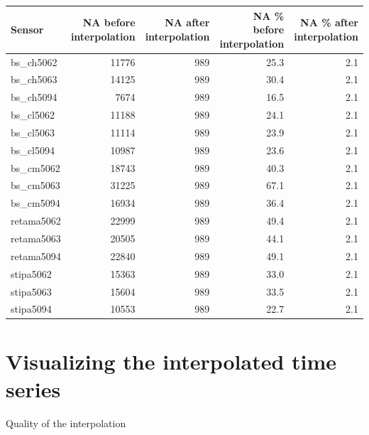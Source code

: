 \documentclass[]{article}
\begin{document}
\begin{tabular}[t]{l|r|r|r|r}
\hline
Sensor & NA before interpolation & NA after interpolation & NA \% before interpolation & NA \% after interpolation\\
\hline
bs\_ch5062 & 11776 & 989 & 25.3 & 2.1\\
\hline
bs\_ch5063 & 14125 & 989 & 30.4 & 2.1\\
\hline
bs\_ch5094 & 7674 & 989 & 16.5 & 2.1\\
\hline
bs\_cl5062 & 11188 & 989 & 24.1 & 2.1\\
\hline
bs\_cl5063 & 11114 & 989 & 23.9 & 2.1\\
\hline
bs\_cl5094 & 10987 & 989 & 23.6 & 2.1\\
\hline
bs\_cm5062 & 18743 & 989 & 40.3 & 2.1\\
\hline
bs\_cm5063 & 31225 & 989 & 67.1 & 2.1\\
\hline
bs\_cm5094 & 16934 & 989 & 36.4 & 2.1\\
\hline
retama5062 & 22999 & 989 & 49.4 & 2.1\\
\hline
retama5063 & 20505 & 989 & 44.1 & 2.1\\
\hline
retama5094 & 22840 & 989 & 49.1 & 2.1\\
\hline
stipa5062 & 15363 & 989 & 33.0 & 2.1\\
\hline
stipa5063 & 15604 & 989 & 33.5 & 2.1\\
\hline
stipa5094 & 10553 & 989 & 22.7 & 2.1\\
\hline
\end{tabular}

\hypertarget{visualizing-the-interpolated-time-series}{%
\section{Visualizing the interpolated time
series}\label{visualizing-the-interpolated-time-series}}

Quality of the interpolation
\end{document}
